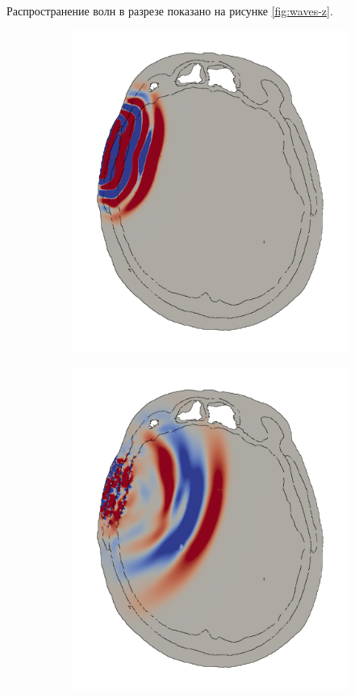 \documentclass[a4paper]{article}
\numberwithin{equation}{section}
\begin{document}
Распространение волн в разрезе показано на рисунке \ref{fig:waves-z}.
\begin{figure}[H]
\centering
\begin{subfigure}{.25\textwidth}
  \centering
  \includegraphics[width=1.0\linewidth]{pictures/skull/elastic-pressure-z-with-bounds/six/1.png}
\end{subfigure}
\begin{subfigure}{.25\textwidth}
  \centering
  \includegraphics[width=1.0\linewidth]{pictures/skull/elastic-pressure-z-with-bounds/six/2.png}

\end{subfigure}
\end{figure}
\end{document}
